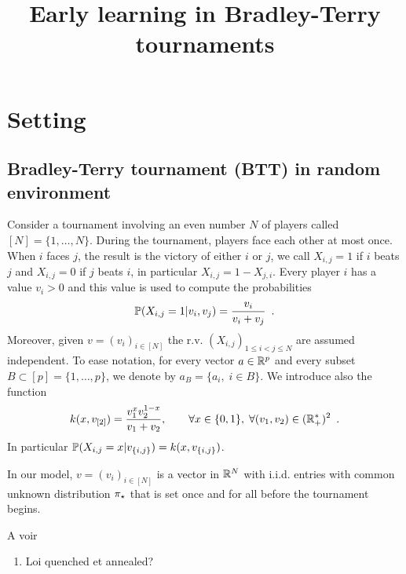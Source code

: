 


\title{Early learning in Bradley-Terry tournaments}
\date{}

\author{}

\lhead{}

\maketitle

\begin{abstract}

\end{abstract}
\section{Setting}
\subsection{Bradley-Terry tournament (BTT) in random environment}
Consider a tournament involving an even number $N$ of players called $[N]=\{1,\ldots,N\}$. During the tournament, players face each other at most once. When $i$ faces $j$, the result is the victory of either $i$ or $j$, we call $X_{i,j}=1$ if $i$ beats $j$ and $X_{i,j}=0$ if $j$ beats $i$, in particular $X_{i,j}=1-X_{j,i}$. Every player $i$ has a value $v_i>0$ and this value is used to compute the probabilities
\[
\mathbb{P}(X_{i,j}=1|v_i,v_j)=\frac{v_i}{v_i+v_j}\enspace.
\]
Moreover, given $v=(v_i)_{i\in[N]}$ the r.v. $(X_{i,j})_{1\le i<j\le N}$ are assumed independent. To ease notation, for every vector $a\in \mathbb{R}^p$ and every subset $B\subset [p]=\{1,\ldots,p\}$, we denote by $a_{B}=\{a_i,\;i\in B\}$. We introduce also the function 
\[
k(x,v_{[2]})=\frac{v_1^xv_2^{1-x}}{v_1+v_2},\qquad \forall x\in \{0,1\},\;\forall (v_1,v_2)\in(\mathbb{R}_+^*)^2\enspace.
\]
In particular $\mathbb{P}(X_{i,j}=x|v_{\{i,j\}})=k(x,v_{\{i,j\}})$.

In our model, $v=(v_i)_{i\in [N]}$ is a vector in $\mathbb{R}^N$ with i.i.d. entries with common unknown distribution $\pi_{\star}$ that is set once and for all before the tournament begins. 

A voir
\begin{enumerate}
 \item Loi quenched et annealed?
\end{enumerate}

